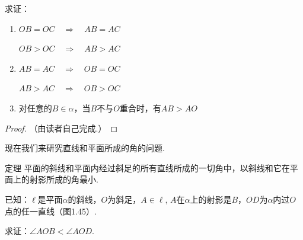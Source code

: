 \noindent
\begin{minipage}{.6\textwidth}
    求证：
    \begin{enumerate}[(1)]
        \item $OB=OC\quad\Rightarrow\quad AB=AC$
    
        $OB>OC\quad\Rightarrow\quad AB>AC$
        \item $AB=AC\quad\Rightarrow\quad OB=OC$
    
        $AB>AC\quad\Rightarrow\quad OB>OC$
    \item 对任意的$B\in\alpha$，当$B$不与$O$重合时，有$AB>AO$
    \end{enumerate}
\end{minipage}
\hfill
\begin{minipage}{.38\textwidth}
\centering
{}
\end{minipage}

\begin{proof}
    （由读者自己完成.）
\end{proof}

现在我们来研究直线和平面所成的角的问题.

\begin{thm}
  {定理} 平面的斜线和平面内经过斜足的所有直线所成的一切角中，以斜线和它在平面上的射影所成的角最小.  
\end{thm}

已知：$\ell$是平面$\alpha$的斜线，$O$为斜足，$A\in\ell$, $A$在$\alpha$上的射影是$B$，$OD$为$\alpha$内过$O$点的任一直线（图1.45）.

求证：$\angle AOB<\angle AOD$.

